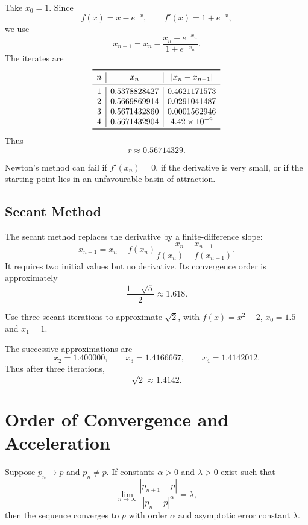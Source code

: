 \begin{solution}[5.8cm]
Take $x_0=1$.  Since
\[
 f(x)=x-e^{-x},
 \qquad
 f'(x)=1+e^{-x},
\]
we use
\[
 x_{n+1}=x_n-\frac{x_n-e^{-x_n}}{1+e^{-x_n}}.
\]
The iterates are
\[
\begin{array}{c|c|c}
\toprule
n&x_n&|x_n-x_{n-1}|\\
\midrule
1&0.5378828427&0.4621171573\\
2&0.5669869914&0.0291041487\\
3&0.5671432860&0.0001562946\\
4&0.5671432904&4.42\times10^{-9}\\
\bottomrule
\end{array}
\]
Thus
\[
 r\approx0.56714329.
\]
\end{solution}

Newton's method can fail if $f'(x_n)=0$, if the derivative is very small, or if the starting point lies in an unfavourable basin of attraction.

\subsection{Secant Method}

The secant method replaces the derivative by a finite-difference slope:
\[
 x_{n+1}
 =x_n-f(x_n)
 \frac{x_n-x_{n-1}}{f(x_n)-f(x_{n-1})}.
\]
It requires two initial values but no derivative.  Its convergence order is approximately
\[
 \frac{1+\sqrt5}{2}\approx1.618.
\]

\begin{example}
Use three secant iterations to approximate $\sqrt2$, with $f(x)=x^2-2$, $x_0=1.5$ and $x_1=1$.
\end{example}

\begin{solution}[3.5cm]
The successive approximations are
\[
 x_2=1.400000,
 \qquad
 x_3=1.4166667,
 \qquad
 x_4=1.4142012.
\]
Thus after three iterations,
\[
 \sqrt2\approx1.4142.
\]
\end{solution}

\section{Order of Convergence and Acceleration}

\begin{definition}
Suppose $p_n\to p$ and $p_n\ne p$.  If constants $\alpha>0$ and $\lambda>0$ exist such that
\[
 \lim_{n\to\infty}
 \frac{|p_{n+1}-p|}{|p_n-p|^\alpha}
 =\lambda,
\]
then the sequence converges to $p$ with order $\alpha$ and asymptotic error constant $\lambda$.
\end{definition}

